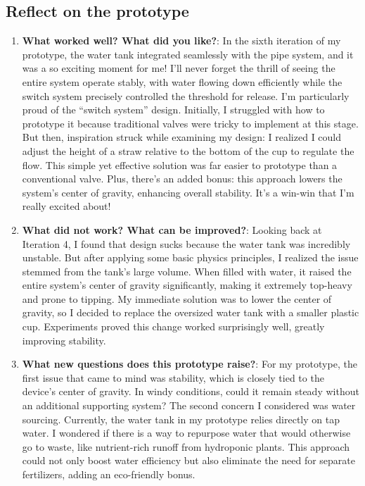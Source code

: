 \documentclass[math,code]{amznotes}
\theoremstyle{remark}
\begin{document}
\subsection{Reflect on the prototype}
\begin{enumerate}
    \item \textbf{What worked well? What did you like?}: In the sixth iteration of my prototype, the water tank integrated seamlessly with the pipe system, and it was a so exciting moment for me! I’ll never forget the thrill of seeing the entire system operate stably, with water flowing down efficiently while the switch system precisely controlled the threshold for release. I’m particularly proud of the ``switch system'' design. Initially, I struggled with how to prototype it because traditional valves were tricky to implement at this stage. But then, inspiration struck while examining my design: I realized I could adjust the height of a straw relative to the bottom of the cup to regulate the flow. This simple yet effective solution was far easier to prototype than a conventional valve. Plus, there’s an added bonus: this approach lowers the system’s center of gravity, enhancing overall stability. It’s a win-win that I’m really excited about!
    \item \textbf{What did not work? What can be improved?}: Looking back at Iteration 4, I found that design sucks because the water tank was incredibly unstable. But after applying some basic physics principles, I realized the issue stemmed from the tank’s large volume. When filled with water, it raised the entire system’s center of gravity significantly, making it extremely top-heavy and prone to tipping. My immediate solution was to lower the center of gravity, so I decided to replace the oversized water tank with a smaller plastic cup. Experiments proved this change worked surprisingly well, greatly improving stability.
    \item \textbf{What new questions does this prototype raise?}: For my prototype, the first issue that came to mind was stability, which is closely tied to the device’s center of gravity. In windy conditions, could it remain steady without an additional supporting system? The second concern I considered was water sourcing. Currently, the water tank in my prototype relies directly on tap water. I wondered if there is a way to repurpose water that would otherwise go to waste, like nutrient-rich runoff from hydroponic plants. This approach could not only boost water efficiency but also eliminate the need for separate fertilizers, adding an eco-friendly bonus.

\end{enumerate}
\end{document}
